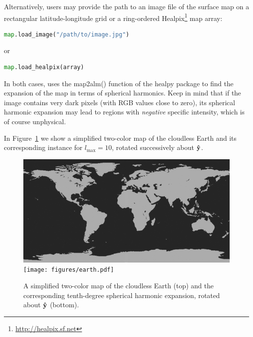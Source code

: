 \documentclass[modern]{aastex61}
\begin{document}
Alternatively, users may provide the path to an image file of the
surface map on a rectangular latitude-longitude grid or a ring-ordered
\textsf{Healpix}\footnote{\url{http://healpix.sf.net}} map array:
%
\begin{lstlisting}[language=Python,firstnumber=last]
map.load_image("/path/to/image.jpg")
\end{lstlisting}
%
or
%
\begin{lstlisting}[language=Python,firstnumber=last]
map.load_healpix(array)
\end{lstlisting}
%
In both cases, \starry uses the \textsf{map2alm()} function
of the \textsf{healpy} package to find the expansion of the map in
terms of spherical harmonics. Keep in mind that if the image contains very dark
pixels (with \textsf{RGB} values close to zero), its spherical harmonic
expansion may lead to regions with \emph{negative} specific intensity, which
is of course unphysical.

In Figure~\ref{fig:earth} we show a
simplified two-color map of the cloudless Earth and its corresponding
\starry instance for
$l_\mathrm{max} = 10$, rotated successively about $\mathbf{\hat{y}}$.
%
\begin{figure}[ht!]
    \begin{centering}
    \includegraphics[width=0.8\linewidth]{figures/earth.jpg}
    \\[1em]
    \texttt{[image: figures/earth.pdf]}
    \caption{\label{fig:earth}
             A simplified two-color map of the cloudless Earth (top) and the
             corresponding tenth-degree spherical harmonic expansion,
             rotated about $\mathbf{\hat{y}}$ (bottom).}
    \end{centering}
\end{figure}
%

\end{document}
